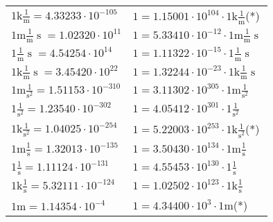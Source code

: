 \begin{center}
\begin{longtable}{l l}
{\color{gray}$1 \bm{\mathrm{ k}}\frac1{\operatorname{m}}{}{}{} = 4.33233\cdot10^{-105} $}   & {\color{gray}$ 1 = 1.15001\cdot10^{104} \cdot 1 \bm{\mathrm{ k}}\frac1{\operatorname{m}}{}{}{}$}\quad(*)\\
{\color{gray}$1 \bm{\mathrm{ m}}\frac1{\operatorname{m}}{\operatorname{s}}{}{} = 1.02320\cdot10^{11} $}   & {\color{gray}$ 1 = 5.33410\cdot10^{-12} \cdot 1 \bm{\mathrm{ m}}\frac1{\operatorname{m}}{\operatorname{s}}{}{}$}  \\
{\color{black}$1 \bm{\mathrm{ }}\frac1{\operatorname{m}}{\operatorname{s}}{}{} = 4.54254\cdot10^{14} $}   & {\color{black}$ 1 = 1.11322\cdot10^{-15} \cdot 1 \bm{\mathrm{ }}\frac1{\operatorname{m}}{\operatorname{s}}{}{}$}  \\
{\color{gray}$1 \bm{\mathrm{ k}}\frac1{\operatorname{m}}{\operatorname{s}}{}{} = 3.45420\cdot10^{22} $}   & {\color{gray}$ 1 = 1.32244\cdot10^{-23} \cdot 1 \bm{\mathrm{ k}}\frac1{\operatorname{m}}{\operatorname{s}}{}{}$}  \\
{\color{gray}$1 \bm{\mathrm{ m}}{}\frac1{\operatorname{s}^2}{}{} = 1.51153\cdot10^{-310} $}   & {\color{gray}$ 1 = 3.11302\cdot10^{305} \cdot 1 \bm{\mathrm{ m}}{}\frac1{\operatorname{s}^2}{}{}$}  \\
{\color{black}$1 \bm{\mathrm{ }}{}\frac1{\operatorname{s}^2}{}{} = 1.23540\cdot10^{-302} $}   & {\color{black}$ 1 = 4.05412\cdot10^{301} \cdot 1 \bm{\mathrm{ }}{}\frac1{\operatorname{s}^2}{}{}$}  \\
{\color{gray}$1 \bm{\mathrm{ k}}{}\frac1{\operatorname{s}^2}{}{} = 1.04025\cdot10^{-254} $}   & {\color{gray}$ 1 = 5.22003\cdot10^{253} \cdot 1 \bm{\mathrm{ k}}{}\frac1{\operatorname{s}^2}{}{}$}\quad(*)\\
{\color{gray}$1 \bm{\mathrm{ m}}{}\frac1{\operatorname{s}}{}{} = 1.32013\cdot10^{-135} $}   & {\color{gray}$ 1 = 3.50430\cdot10^{134} \cdot 1 \bm{\mathrm{ m}}{}\frac1{\operatorname{s}}{}{}$}  \\
{\color{black}$1 \bm{\mathrm{ }}{}\frac1{\operatorname{s}}{}{} = 1.11124\cdot10^{-131} $}   & {\color{black}$ 1 = 4.55453\cdot10^{130} \cdot 1 \bm{\mathrm{ }}{}\frac1{\operatorname{s}}{}{}$}  \\
{\color{gray}$1 \bm{\mathrm{ k}}{}\frac1{\operatorname{s}}{}{} = 5.32111\cdot10^{-124} $}   & {\color{gray}$ 1 = 1.02502\cdot10^{123} \cdot 1 \bm{\mathrm{ k}}{}\frac1{\operatorname{s}}{}{}$}  \\
{\color{gray}$1 \bm{\mathrm{ m}}{}{}{}{} = 1.14354\cdot10^{-4} $}   & {\color{gray}$ 1 = 4.34400\cdot10^{3} \cdot 1 \bm{\mathrm{ m}}{}{}{}{}$}\quad(*)\\

\end{longtable}
\end{center}
